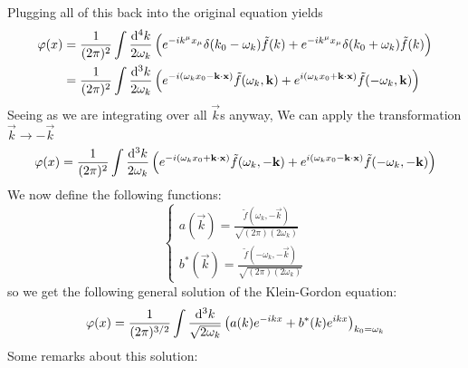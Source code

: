 Plugging all of this back into the original equation yields
\begin{align*}
\varphi(x) &= \frac{1}{(2\pi)^2} \int \frac{\operatorname{d \!}{^{4}k}}{2\omega_k}\left(e^{-ik^\mu x_\mu}\delta(k_0 - \omega_k)\tilde{f}(k) + e^{-ik^\mu x_\mu}\delta(k_0 + \omega_k)\tilde{f}(k)\right) \\
&= \frac{1}{(2\pi)^2} \int \frac{\operatorname{d \!}{^{3}k}}{2\omega_k}\left(e^{-i(\omega_kx_0 - \bm{\mathrm{k}}\cdot\bm{\mathrm{x}})}\tilde{f}(\omega_k, \bm{\mathrm{k}}) + e^{i(\omega_kx_0 + \bm{\mathrm{k}}\cdot\bm{\mathrm{x}})}\tilde{f}(-\omega_k, \bm{\mathrm{k}})\right)
\end{align*}
Seeing as we are integrating over all $\vec{k}$s anyway, We can apply the transformation $\vec{k} \to -\vec{k}$
\[\varphi(x) = \frac{1}{(2\pi)^2} \int \frac{\operatorname{d \!}{^{3}k}}{2\omega_k}\left(e^{-i(\omega_kx_0 + \bm{\mathrm{k}}\cdot\bm{\mathrm{x}})}\tilde{f}(\omega_k, -\bm{\mathrm{k}}) + e^{i(\omega_kx_0 - \bm{\mathrm{k}}\cdot\bm{\mathrm{x}})}\tilde{f}(-\omega_k, -\bm{\mathrm{k}})\right)\]
We now define the following functions:
\[ \begin{cases}
a(\vec{k}) = \frac{\tilde{f}(\omega_k, -\vec{k})}{\sqrt{(2\pi)(2\omega_k)}} \\
b^*(\vec{k}) = \frac{\tilde{f}(-\omega_k, -\vec{k})}{\sqrt{(2\pi)(2\omega_k)}}
\end{cases} \]
so we get the following general solution of the Klein-Gordon equation:
\[\varphi(x) = \frac{1}{(2\pi)^{3/2}} \int \frac{\operatorname{d \!}{^{3}k}}{\sqrt{2\omega_k}}\left(a(k)e^{-ikx} + b^*(k)e^{ikx}\right)_{k_0 = \omega_k}\]
Some remarks about this solution:
